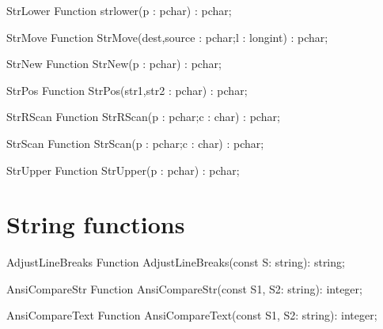  
\begin{function}{StrLower}
\Declaration
Function strlower(p : pchar) : pchar;
\Description
\Errors
\SeeAlso
\end{function}

 
\begin{function}{StrMove}
\Declaration
Function StrMove(dest,source : pchar;l : longint) : pchar;
\Description
\Errors
\SeeAlso
\end{function}

 
\begin{function}{StrNew}
\Declaration
Function StrNew(p : pchar) : pchar;
\Description
\Errors
\SeeAlso
\end{function}

 
\begin{function}{StrPos}
\Declaration
Function StrPos(str1,str2 : pchar) : pchar;
\Description
\Errors
\SeeAlso
\end{function}

 
\begin{function}{StrRScan}
\Declaration
Function StrRScan(p : pchar;c : char) : pchar;
\Description
\Errors
\SeeAlso
\end{function}

 
\begin{function}{StrScan}
\Declaration
Function StrScan(p : pchar;c : char) : pchar;
\Description
\Errors
\SeeAlso
\end{function}

 
\begin{function}{StrUpper}
\Declaration
Function StrUpper(p : pchar) : pchar;
\Description
\Errors
\SeeAlso
\end{function}

\section{String functions}

\begin{function}{AdjustLineBreaks}
\Declaration
Function AdjustLineBreaks(const S: string): string;
\Description
\Errors
\SeeAlso
\end{function}

 
\begin{function}{AnsiCompareStr}
\Declaration
Function AnsiCompareStr(const S1, S2: string): integer;
\Description
\Errors
\SeeAlso
\end{function}

 
\begin{function}{AnsiCompareText}
\Declaration
Function AnsiCompareText(const S1, S2: string): integer;
\Description
\Errors
\SeeAlso
\end{function}


